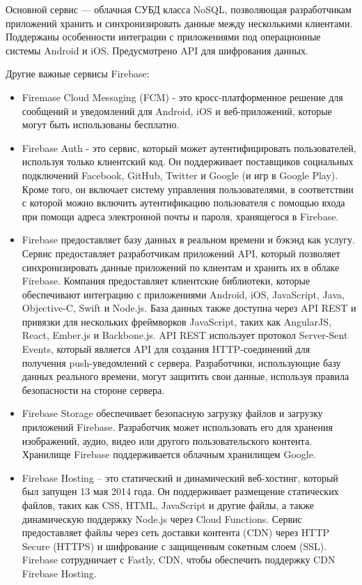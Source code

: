 Основной сервис — облачная СУБД класса NoSQL, позволяющая разработчикам приложений хранить и синхронизировать данные между несколькими клиентами. Поддержаны особенности интеграции с приложениями под операционные системы Android и iOS. \newline Предусмотрено API для шифрования данных.

Другие важные сервисы Firebase:

\begin{itemize}
	\item Firemase Cloud Messaging (FCM) - это кросс-платформенное решение для сообщений и уведомлений для Android, iOS и веб-приложений, которые могут быть использованы бесплатно.
	\item Firebase Auth - это сервис, который может аутентифицировать пользователей, используя только клиентский код. Он поддерживает поставщиков социальных подключений Facebook, GitHub, Twitter и Google (и игр в Google Play). Кроме того, он включает систему управления пользователями, в соответствии с которой можно включить аутентификацию пользователя с помощью входа при помощи адреса электронной почты и пароля, хранящегося в Firebase.
	\item Firebase предоставляет базу данных в реальном времени и бэкэнд как услугу. Сервис предоставляет разработчикам приложений API, который позволяет синхронизировать данные приложений по клиентам и хранить их в облаке Firebase. Компания предоставляет клиентские библиотеки, которые обеспечивают интеграцию с приложениями Android, iOS, JavaScript, Java, Objective-C, Swift и Node.js. База данных также доступна через API REST и привязки для нескольких фреймворков JavaScript, таких как AngularJS, React, Ember.js и Backbone.js. API REST использует протокол Server-Sent Events, который является API для создания HTTP-соединений для получения push-уведомлений с сервера. Разработчики, использующие базу данных реального времени, могут защитить свои данные, используя правила безопасности на стороне сервера.
	\item Firebase Storage обеспечивает безопасную загрузку файлов и загрузку приложений Firebase. Разработчик может использовать его для хранения изображений, аудио, видео или другого пользовательского контента. Хранилище Firebase поддерживается облачным хранилищем Google.
	\item Firebase Hosting – это статический и динамический веб-хостинг, который был запущен 13 мая 2014 года. Он поддерживает размещение статических файлов, таких как CSS, HTML, JavaScript и другие файлы, а также динамическую поддержку Node.js через Cloud Functions. Сервис предоставляет файлы через сеть доставки контента (CDN) через HTTP Secure (HTTPS) и шифрование с защищенным сокетным слоем (SSL). Firebase сотрудничает с Fastly, CDN, чтобы обеспечить поддержку CDN Firebase Hosting.
\end{itemize}

